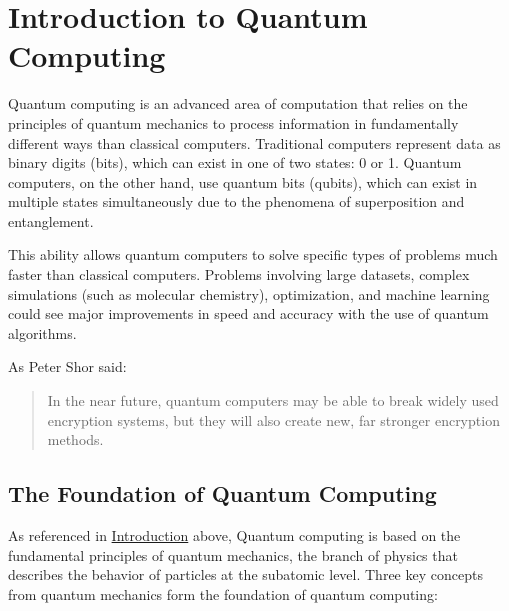 \documentclass[
  12pt,
  a4paper,
  ]{report}
\begin{document}

\renewcommand*\contentsname{Table of Contents}
{
\hypersetup{linkcolor=blue}
\setcounter{tocdepth}{2}
\tableofcontents
}
\listoffigures
\listoftables
{}
\clearpage
{}
\chapter{Introduction to Quantum Computing}\label{chap1}

Quantum computing is an advanced area of computation that relies on the
principles of quantum mechanics to process information in fundamentally
different ways than classical computers. Traditional computers represent
data as binary digits (bits), which can exist in one of two states: 0 or
1. Quantum computers, on the other hand, use quantum bits (qubits),
which can exist in multiple states simultaneously due to the phenomena
of superposition and entanglement.

This ability allows quantum computers to solve specific types of
problems much faster than classical computers. Problems involving large
datasets, complex simulations (such as molecular chemistry),
optimization, and machine learning could see major improvements in speed
and accuracy with the use of quantum algorithms.

As Peter Shor said:

\begin{quote}
In the near future, quantum computers may be able to break widely used
encryption systems, but they will also create new, far stronger
encryption methods.
\end{quote}

\section{The Foundation of Quantum Computing}\label{foundation}

As referenced in \href{chap1}{Introduction} above, Quantum computing is
based on the fundamental principles of quantum mechanics, the branch of
physics that describes the behavior of particles at the subatomic level.
Three key concepts from quantum mechanics form the foundation of quantum
computing:
\end{document}
